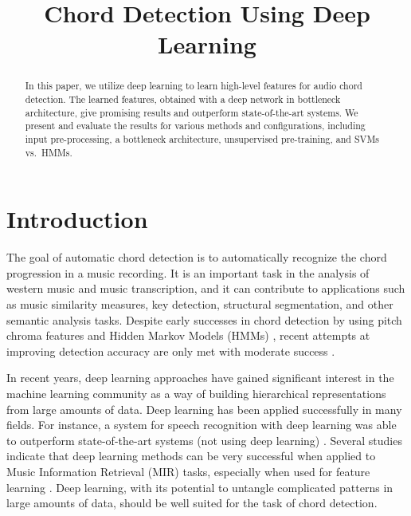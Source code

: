 \documentclass{article}
\title{Chord Detection Using Deep Learning}
\begin{document}
%
\maketitle
%
\begin{abstract}
In this paper, we utilize deep learning to learn high-level features for audio chord detection. The learned features, obtained with a deep network in bottleneck architecture, give promising results and outperform state-of-the-art systems. We present and evaluate the results for various methods and configurations, including input pre-processing, a bottleneck architecture, unsupervised pre-training, and SVMs vs.\ HMMs. 
\end{abstract}
%
\section{Introduction}
The goal of automatic chord detection is to automatically recognize the chord progression in a music recording. It is an important task in the analysis of western music and music transcription, and it can contribute to applications such as music similarity measures, key detection, structural segmentation, and other semantic analysis tasks. Despite early successes in chord detection by using pitch chroma features and Hidden Markov Models (HMMs) \cite{fujishima1999realtime}, recent attempts at improving detection accuracy are only met with moderate success \cite{ueda2010hmm,cho2013mirex}.

In recent years, deep learning approaches have gained significant interest in the machine learning community as a way of building hierarchical representations from large amounts of data. Deep learning has been applied successfully in many fields. For instance, a system for speech recognition with deep learning was able to outperform state-of-the-art systems (not using deep learning) \cite{hinton2012deep}. Several studies indicate that deep learning methods can be very successful when applied to Music Information Retrieval (MIR) tasks, especially when used for feature learning \cite{lee2009unsupervised,battenberg2012analyzing,humphrey2012moving,hamel2010learning}. Deep learning, with its potential to untangle complicated patterns in large amounts of data, should be well suited for the task of chord detection.
\end{document}
